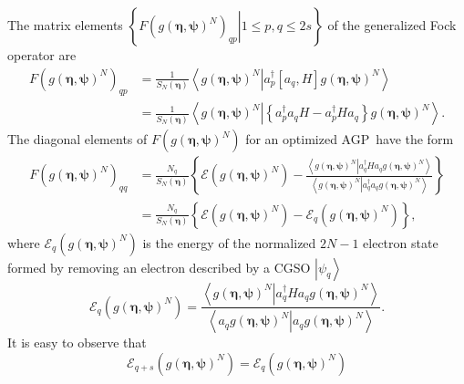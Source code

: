 \documentclass[aps,preprint]{revtex4}%
\begin{document}
The matrix elements $\left\{  \left.  F\left(  g\left(  \bm{\eta
},\bm{\psi}\right)  ^{N}\right)  _{qp}\right\vert 1\leq p,q\leq2s\right\}  $
of the generalized Fock operator are
\begin{align}
F\left(  g\left(  \bm{\eta},\bm{\psi}\right)  ^{N}\right)  _{qp}  &  =\frac
{1}{S_{N}\left(  \bm{\eta}\right)  }\left\langle \left.  g\left(
\bm{\eta},\bm{\psi}\right)  ^{N}\right\vert a_{p}^{\dagger}\left[
a_{q},H\right]  g\left(  \bm{\eta},\bm{\psi}\right)  ^{N}\right\rangle
\nonumber\\
&  =\frac{1}{S_{N}\left(  \bm{\eta}\right)  }\left\langle \left.  g\left(
\bm{\eta},\bm{\psi}\right)  ^{N}\right\vert \left\{  a_{p}^{\dagger}%
a_{q}H-a_{p}^{\dagger}Ha_{q}\right\}  g\left(  \bm{\eta},\bm{\psi }\right)
^{N}\right\rangle .
\end{align}
The diagonal elements of $F\left(  g\left(  \bm{\eta},\bm{\psi
}\right)  ^{N}\right)  $ for an optimized AGP\ have the form
\begin{align}
F\left(  g\left(  \bm{\eta},\bm{\psi}\right)  ^{N}\right)  _{qq}  &
=\frac{N_{q}}{S_{N}\left(  \bm{\eta}\right)  }\left\{  \mathcal{E}\left(
g\left(  \bm{\eta},\bm{\psi}\right)  ^{N}\right)  -\frac{\left\langle \left.
g\left(  \bm{\eta},\bm{\psi}\right)  ^{N}\right\vert a_{q}^{\dagger}%
Ha_{q}g\left(  \bm{\eta},\bm{\psi}\right)  ^{N}\right\rangle }{\left\langle
\left.  g\left(  \bm{\eta},\bm{\psi }\right)  ^{N}\right\vert a_{q}^{\dagger
}a_{q}g\left(  \bm{\eta },\bm{\psi}\right)  ^{N}\right\rangle }\right\}
\nonumber\\
&  =\frac{N_{q}}{S_{N}\left(  \bm{\eta}\right)  }\left\{  \mathcal{E}\left(
g\left(  \bm{\eta},\bm{\psi}\right)  ^{N}\right)  -\mathcal{E}_{q}\left(
g\left(  \bm{\eta},\bm{\psi}\right)  ^{N}\right)  \right\}  ,
\end{align}
where $\mathcal{E}_{q}\left(  g\left(  \bm{\eta},\bm{\psi}\right)
^{N}\right)  $ is the energy of the normalized $2N-1$ electron state formed by
removing an electron described by a CGSO $\left\vert \psi_{q}\right\rangle $
\begin{equation}
\mathcal{E}_{q}\left(  g\left(  \bm{\eta},\bm{\psi}\right)  ^{N}\right)
=\frac{\left\langle \left.  g\left(  \bm{\eta},\bm{\psi }\right)
^{N}\right\vert a_{q}^{\dagger}Ha_{q}g\left(  \bm{\eta },\bm{\psi}\right)
^{N}\right\rangle }{\left\langle \left.  a_{q}g\left(
\bm{\eta},\bm{\psi}\right)  ^{N}\right\vert a_{q}g\left(
\bm{\eta},\bm{\psi}\right)  ^{N}\right\rangle }.
\end{equation}
It is easy to observe that
\begin{equation}
\mathcal{E}_{q+s}\left(  g\left(  \bm{\eta},\bm{\psi}\right)  ^{N}\right)
=\mathcal{E}_{q}\left(  g\left(  \bm{\eta},\bm{\psi }\right)  ^{N}\right)
\end{equation}
\end{document}
